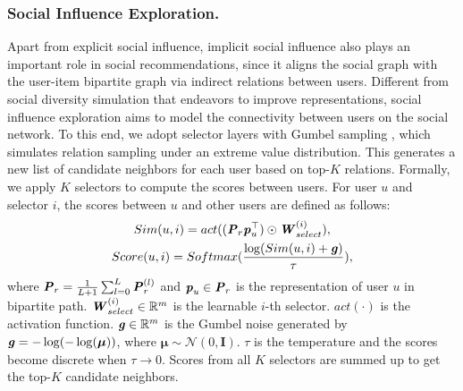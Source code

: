\documentclass[letterpaper]{article} %
\begin{document}
\subsubsection{Social Influence Exploration.}
Apart from explicit social influence, implicit social influence also plays an important role in social recommendations, since it aligns the social graph with the user-item bipartite graph via indirect relations between users. Different from social diversity simulation that endeavors to improve representations, social influence exploration aims to model the connectivity between users on the social network. To this end, we adopt selector layers with Gumbel sampling \cite{gumbel,ESRF}, which simulates relation sampling under an extreme value distribution. This generates a new list of candidate neighbors for each user based on top-$K$ relations. Formally, we apply $K$ selectors to compute the scores between users. For user $u$ and selector $i$, the scores between $u$ and other users are defined as follows:
\begin{gather}
    Sim(u, i) = act((\textbf{\textit{P}}_r \textbf{\textit{p}}_u^{\top})\odot \textbf{\textit{W}}_{select}^{(i)}),\\
    Score(u, i) = Softmax(\frac{\log(Sim(u, i)+\textbf{\textit{g}})}{\tau}),
\end{gather}
where $\textbf{\textit{P}}_{r}=\frac{1}{L+1}\sum_{l=0}^{L}{\textbf{\textit{P}}^{(l)}_r}$ and $\textbf{\textit{p}}_u \in \textbf{\textit{P}}_r$ is the representation of user $u$ in bipartite path. $\textbf{\textit{W}}_{select}^{(i)} \in \mathbb{R}^m$ is the learnable $i$-th selector. $act(\cdot)$ is the activation function. $\textbf{\textit{g}} \in \mathbb{R}^{m}$ is the Gumbel noise generated by $\textbf{\textit{g}}=-\log(-\log(\boldsymbol{\mu}))$, where $\boldsymbol{\mu} \sim \boldsymbol{\mathcal{N}}(0,\textbf{I})$. $\tau$ is the temperature and the scores become discrete when $\tau \rightarrow 0$. Scores from all $K$ selectors are summed up to get the top-$K$ candidate neighbors.
\end{document}
